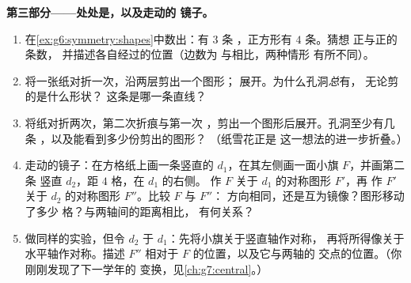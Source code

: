 \begin{problem}
\medskip
\noindent\textbf{第三部分——处处是，以及走动的
镜子。}
\begin{enumerate}[resume]
  \item 在\cref{ex:g6:symmetry:shapes}中数出：有 $3$ 条
        ，正方形有 $4$ 条。猜想
        正与正的条数，
        并描述各自经过的位置（边数为
        与相比，两种情形
        有所不同）。
  \item 将一张纸对折一次，沿两层剪出一个图形；
        展开。为什么孔洞\emph{总}有，
        无论剪的是什么形状？
        这条是哪一条直线？
  \item 将纸对折两次，第二次折痕与第一次
        ，剪出一个图形后展开。孔洞至少有几条
        ，以及能看到多少份剪出的图形？
        （纸雪花正是
        这一想法的进一步折叠。）
  \item 走动的镜子：在方格纸上画一条竖直的
        $d_1$，在其左侧画一面小旗 $F$，并画第二条
        竖直 $d_2$，距 $4$ 格，在 $d_1$ 的右侧。
        作 $F$ 关于 $d_1$ 的对称图形 $F'$，再
        作 $F'$ 关于 $d_2$ 的对称图形 $F''$。比较 $F$ 与 $F''$：
        方向相同，还是互为镜像？图形移动了多少
        格？与两轴间的距离相比，
        有何关系？
  \item 做同样的实验，但令 $d_2$ \emph{}于
        $d_1$：先将小旗关于竖直轴作对称，
        再将所得像关于水平轴作对称。描述 $F''$
        相对于 $F$ 的位置，以及它与两轴的
        交点的位置。（你刚刚发现了下一学年的
        变换，见\cref{ch:g7:central}。）
\end{enumerate}
\end{problem}
